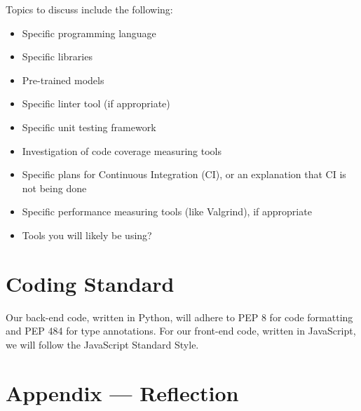 \documentclass{article}
\begin{document}

Topics to discuss include the following:

\begin{itemize}
\item Specific programming language
\item Specific libraries
\item Pre-trained models
\item Specific linter tool (if appropriate)
\item Specific unit testing framework
\item Investigation of code coverage measuring tools
\item Specific plans for Continuous Integration (CI), or an explanation that CI
  is not being done
\item Specific performance measuring tools (like Valgrind), if
  appropriate
\item Tools you will likely be using?
\end{itemize}


\section{Coding Standard}
Our back-end code, written in Python, will adhere to PEP 8 for code formatting and PEP 484 for type annotations. 
For our front-end code, written in JavaScript, we will follow the JavaScript Standard Style.

\newpage{}

\section*{Appendix --- Reflection}


% 
\end{document}
